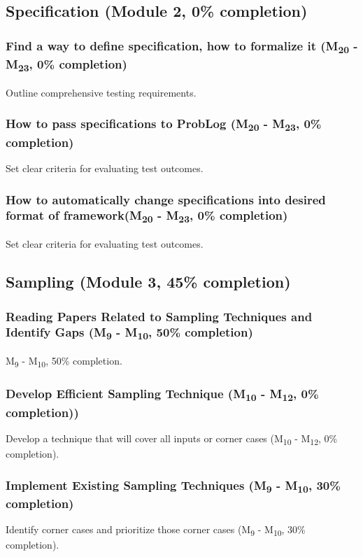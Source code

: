 \subsection{Specification (Module 2, 0\% completion)}
\subsubsection{Find a way to define specification, how to  formalize it (M\textsubscript{20} - M\textsubscript{23}, 0\% completion)}
Outline comprehensive testing requirements.

\subsubsection{How to pass specifications to ProbLog (M\textsubscript{20} - M\textsubscript{23}, 0\% completion)}
Set clear criteria for evaluating test outcomes.

\subsubsection{How to automatically change specifications into desired format of framework(M\textsubscript{20} - M\textsubscript{23}, 0\% completion)}
Set clear criteria for evaluating test outcomes.



\subsection{Sampling (Module 3, 45\% completion)}
\subsubsection{Reading Papers Related to Sampling Techniques and Identify Gaps (M\textsubscript{9} - M\textsubscript{10}, 50\% completion)}
M\textsubscript{9} - M\textsubscript{10}, 50\% completion.

\subsubsection{Develop Efficient Sampling Technique (M\textsubscript{10} - M\textsubscript{12}, 0\% completion))}
Develop a technique that will cover all inputs or corner cases (M\textsubscript{10} - M\textsubscript{12}, 0\% completion).

\subsubsection{Implement Existing Sampling Techniques (M\textsubscript{9} - M\textsubscript{10}, 30\% completion)}
Identify corner cases and prioritize those corner cases (M\textsubscript{9} - M\textsubscript{10}, 30\% completion).

